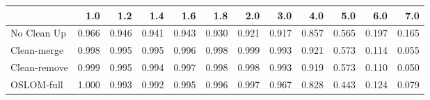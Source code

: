 \begin{tabular}{lrrrrrrrrrrr}
\toprule
{} &   1.0 &   1.2 &   1.4 &   1.6 &   1.8 &   2.0 &   3.0 &   4.0 &   5.0 &   6.0 &   7.0 \\
\midrule
No Clean Up  & 0.966 & 0.946 & 0.941 & 0.943 & 0.930 & 0.921 & 0.917 & 0.857 & 0.565 & 0.197 & 0.165 \\
Clean-merge  & 0.998 & 0.995 & 0.995 & 0.996 & 0.998 & 0.999 & 0.993 & 0.921 & 0.573 & 0.114 & 0.055 \\
Clean-remove & 0.999 & 0.995 & 0.994 & 0.997 & 0.998 & 0.998 & 0.993 & 0.919 & 0.573 & 0.110 & 0.050 \\
OSLOM-full   & 1.000 & 0.993 & 0.992 & 0.995 & 0.996 & 0.997 & 0.967 & 0.828 & 0.443 & 0.124 & 0.079 \\
\bottomrule
\end{tabular}
